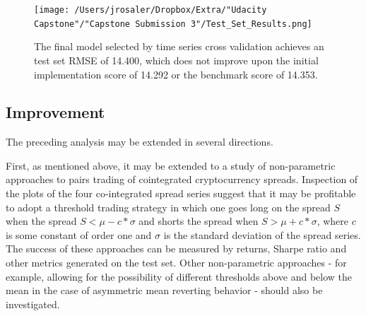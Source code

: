 \documentclass{article}
\begin{document}










\begin{figure}[]
\texttt{[image: /Users/jrosaler/Dropbox/Extra/"Udacity Capstone"/"Capstone Submission 3"/Test\_Set\_Results.png]}
\caption{The final model selected by time series cross validation achieves an test set RMSE of 14.400, which does not improve upon the initial implementation score of 14.292 or the benchmark score of 14.353.} 
\label{TestResults}
\end{figure}




\subsection{Improvement}

The preceding analysis may be extended in several directions. 

First, as mentioned above, it may be extended to a study of non-parametric approaches to pairs trading of cointegrated cryptocurrency spreads. Inspection of the plots of the four co-integrated spread series suggest that it may be profitable to adopt a threshold trading strategy in which one goes long on the spread $S$ when the spread $S < \mu -  c * \sigma$ and shorts the spread when $S > \mu +  c * \sigma$, where $c$ is some constant of order one and $\sigma$ is the standard deviation of the spread series. The success of these approaches can be measured by returns, Sharpe ratio and other metrics generated on the test set. Other non-parametric approaches - for example, allowing for the possibility of different thresholds above and below the mean in the case of asymmetric mean reverting behavior - should also be investigated. 
\end{document}
